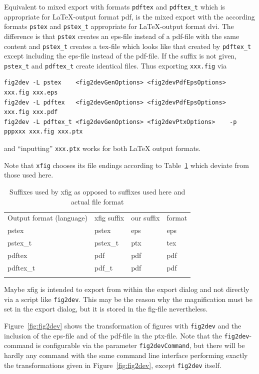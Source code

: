 \documentclass[12pt]{article}
\begin{document}
Equivalent to mixed export with formats {\tt pdftex} and {\tt pdftex\_t} 
which is appropriate for \LaTeX-output format pdf, 
is the mixed export with the according formats 
{\tt pstex} and {\tt pstex\_t} appropriate for \LaTeX-output format dvi. 
The difference is that {\tt pstex} creates an eps-file instead of a pdf-file 
with the same content 
and {\tt pstex\_t} creates a tex-file which looks like that 
created by {\tt pdftex\_t} except including the eps-file 
instead of the pdf-file. 
If the suffix is not given, 
{\tt pstex\_t} and {\tt pdftex\_t} create identical files. 
Thus exporting {\tt xxx.fig} via 
%
\begin{Verbatim}[fontsize=\scriptsize]
fig2dev -L pstex    <fig2devGenOptions> <fig2devPdfEpsOptions>           xxx.fig xxx.eps   
fig2dev -L pdftex   <fig2devGenOptions> <fig2devPdfEpsOptions>           xxx.fig xxx.pdf   
fig2dev -L pdftex_t <fig2devGenOptions> <fig2devPtxOptions>    -p pppxxx xxx.fig xxx.ptx
\end{Verbatim}
%
and ``inputting'' {\tt xxx.ptx} works for both \LaTeX{} output formats. 


Note that {\tt xfig} chooses its file endings 
according to Table~\ref {tab:xfigSuffixes} 
which deviate from those used here. 

\begin{longtable}{|l|lll|}
\hline
Output format (language) & xfig suffix & our suffix & format \\
pstex                    & pstex       & eps        & eps \\
pstex\_t                 & pstex\_t    & ptx        & tex \\
pdftex                   & pdf         & pdf        & pdf \\
pdftex\_t                & pdf\_t      & pdf        & pdf \\
\hline
\caption{\label{tab:xfigSuffixes} Suffixes used by xfig as opposed to suffixes
  used here and actual file format }
\end{longtable}


Maybe xfig is intended to export from within the export dialog 
and not directly via a script like {\tt fig2dev}. 
This may be the reason 
why the magnification must be set in the export dialog, 
but it is stored in the fig-file nevertheless. 

Figure~\ref{fig:fig2dev} shows the transformation 
of figures with {\tt fig2dev} 
and the inclusion of the eps-file and of the pdf-file in the ptx-file. 
Note that the {\tt fig2dev}-command is configurable 
via the parameter {\tt fig2devCommand}, 
but there will be hardly any command with the same command line interface 
performing exactly the transformations given in Figure~\ref{fig:fig2dev}, 
except {\tt fig2dev} itself. 
\end{document}
